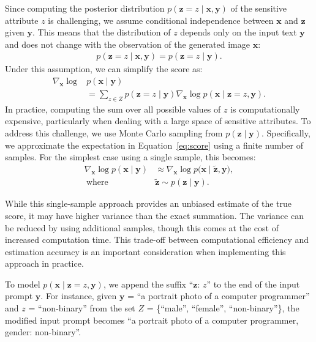 Since computing the posterior distribution $p(\mathbf{z}=z \mid \mathbf{x}, \mathbf{y})$ of the sensitive attribute $z$ is challenging, we assume conditional independence between $\mathbf{x}$ and $\mathbf{z}$ given $\mathbf{y}$. This means that the distribution of $z$ depends only on the input text $\mathbf{y}$ and does not change with the observation of the generated image $\mathbf{x}$:
\begin{align}
    p(\mathbf{z}=z \mid \mathbf{x}, \mathbf{y}) = p(\mathbf{z}=z \mid \mathbf{y}).
\end{align}
Under this assumption, we can simplify the score as:
\begin{align}
    \nonumber
    \nabla_{\mathbf{x}} \log &p(\mathbf{x}\mid \mathbf{y}) \\ 
    &= {\sum_{z\in Z} p(\mathbf{z}=z \mid \mathbf{y}) \nabla_{\mathbf{x}}\log p(\mathbf{x}\mid \mathbf{z}=z, \mathbf{y})}. \label{eq:score}
\end{align}
In practice, computing the sum over all possible values of $z$ is computationally expensive, particularly when dealing with a large space of sensitive attributes. To address this challenge, we use Monte Carlo sampling from $p(\mathbf{z} \mid \mathbf{y})$. Specifically, we approximate the expectation in Equation~\eqref{eq:score} using a finite number of samples.
For the simplest case using a single sample, this becomes:
\begin{align}
    \nonumber
    \nabla_{\mathbf{x}} \log p(\mathbf{x}\mid \mathbf{y})
    &\approx
    \nabla_{\mathbf{x}} \log p\bigl(\mathbf{x}\mid \widetilde{\mathbf{z}}, \mathbf{y}\bigr), \\
    \ \text{where} \ 
    & \widetilde{\mathbf{z}} \sim p(\mathbf{z} \mid \mathbf{y}).
\end{align}

While this single-sample approach provides an unbiased estimate of the true score, it may have higher variance than the exact summation. The variance can be reduced by using additional samples, though this comes at the cost of increased computation time. This trade-off between computational efficiency and estimation accuracy is an important consideration when implementing this approach in practice.

To model $p(\mathbf{x} \mid \mathbf{z}=z, \mathbf{y})$, we append the suffix ``$\mathbf{z}$: $z$'' to the end of the input prompt $\mathbf{y}$. For instance, given $\mathbf{y}$ = ``a portrait photo of a computer programmer'' and $z$ = ``non-binary'' from the set $Z$ = \{``male'', ``female'', ``non-binary''\}, the modified input prompt becomes ``a portrait photo of a computer programmer, gender: non-binary''. 



